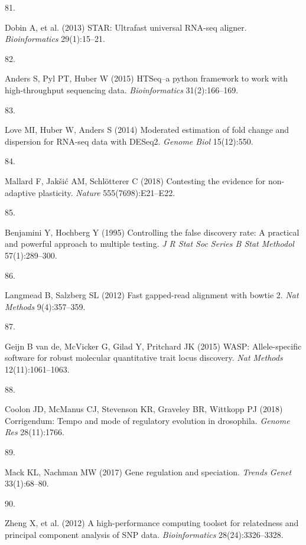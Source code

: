 \documentclass[9pt,twocolumn,twoside,lineno]{pnas-new}
\newlength{\cslhangindent}
\newlength{\csllabelwidth}
\newlength{\cslentryspacingunit} %
\newenvironment{CSLReferences}[2] %
 {%
  \setlength{\parindent}{0pt}
  \ifodd #1
  \let\oldpar\par
  \def\par{\hangindent=\cslhangindent\oldpar}
  \fi
  \setlength{\parskip}{#2\cslentryspacingunit}
 }%
 {}
\newcommand{\CSLLeftMargin}[1]{\parbox[t]{\csllabelwidth}{#1}}
\newcommand{\CSLRightInline}[1]{\parbox[t]{\linewidth - \csllabelwidth}{#1}\break}
\begin{document}
\begin{CSLReferences}{0}{0}
\leavevmode\hypertarget{ref-Dobin2013}{}%
\CSLLeftMargin{81. }
\CSLRightInline{Dobin A, et al. (2013) {STAR}: Ultrafast universal
{RNA-seq} aligner. \emph{Bioinformatics} 29(1):15--21.}

\leavevmode\hypertarget{ref-Anders2015}{}%
\CSLLeftMargin{82. }
\CSLRightInline{Anders S, Pyl PT, Huber W (2015) {HTSeq--a} python
framework to work with high-throughput sequencing data.
\emph{Bioinformatics} 31(2):166--169.}

\leavevmode\hypertarget{ref-Love2014}{}%
\CSLLeftMargin{83. }
\CSLRightInline{Love MI, Huber W, Anders S (2014) Moderated estimation
of fold change and dispersion for {RNA-seq} data with {DESeq2}.
\emph{Genome Biol} 15(12):550.}

\leavevmode\hypertarget{ref-Mallard2018}{}%
\CSLLeftMargin{84. }
\CSLRightInline{Mallard F, Jakšić AM, Schlötterer C (2018) Contesting
the evidence for non-adaptive plasticity. \emph{Nature}
555(7698):E21--E22.}

\leavevmode\hypertarget{ref-Benjamini1995}{}%
\CSLLeftMargin{85. }
\CSLRightInline{Benjamini Y, Hochberg Y (1995) Controlling the false
discovery rate: A practical and powerful approach to multiple testing.
\emph{J R Stat Soc Series B Stat Methodol} 57(1):289--300.}

\leavevmode\hypertarget{ref-Langmead2012}{}%
\CSLLeftMargin{86. }
\CSLRightInline{Langmead B, Salzberg SL (2012) Fast gapped-read
alignment with bowtie 2. \emph{Nat Methods} 9(4):357--359.}

\leavevmode\hypertarget{ref-Van_de_Geijn2015}{}%
\CSLLeftMargin{87. }
\CSLRightInline{Geijn B van de, McVicker G, Gilad Y, Pritchard JK (2015)
{WASP}: Allele-specific software for robust molecular quantitative trait
locus discovery. \emph{Nat Methods} 12(11):1061--1063.}

\leavevmode\hypertarget{ref-Coolon2018}{}%
\CSLLeftMargin{88. }
\CSLRightInline{Coolon JD, McManus CJ, Stevenson KR, Graveley BR,
Wittkopp PJ (2018) Corrigendum: Tempo and mode of regulatory evolution
in drosophila. \emph{Genome Res} 28(11):1766.}

\leavevmode\hypertarget{ref-Mack2017}{}%
\CSLLeftMargin{89. }
\CSLRightInline{Mack KL, Nachman MW (2017) Gene regulation and
speciation. \emph{Trends Genet} 33(1):68--80.}

\leavevmode\hypertarget{ref-Zheng2012}{}%
\CSLLeftMargin{90. }
\CSLRightInline{Zheng X, et al. (2012) A high-performance computing
toolset for relatedness and principal component analysis of {SNP} data.
\emph{Bioinformatics} 28(24):3326--3328.}


\end{CSLReferences}
\end{document}
